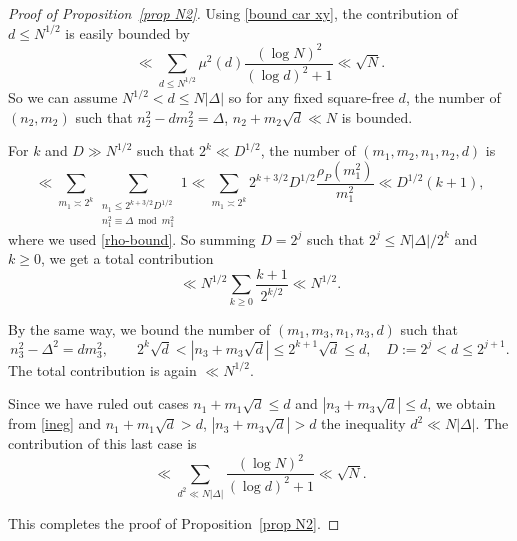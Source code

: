 \documentclass[reqno, 12pt]{amsart}
\theoremstyle{plain}
\theoremstyle{definition}
\theoremstyle{remark}
\renewcommand{\ge}{\geqslant}
\renewcommand{\leq}{\leqslant}
\renewcommand{\geq}{\geqslant}
\begin{document}
\begin{proof}[Proof of Proposition~\ref{prop N2}]
Using \eqref{bound car xy},
the contribution of $d\leq N^{1/2}$ is easily bounded by
$$\ll \sum_{d\leq N^{1/2}}\mu^2(d)\frac{(\log N)^2}{(\log d)^2+1}\ll \sqrt{N}.$$
So we can assume $  N^{1/2}<d\leq N|\Delta| $ so for any fixed square-free $d$, the number of $(n_2,m_2)$ such that $n_2^2-dm_2^2=\Delta$, $n_2 +m_2 \sqrt{d}\ll N$ is bounded.

For $k$ and $D\gg N^{1/2}$ such that $2^k\ll D^{1/2}$, the number of $(m_1,m_2,n_1,n_2,d)$ is 
$$\ll \sum_{m_1\asymp 2^k}\sum_{\substack{n_1\leq 2^{k+3/2}D^{1/2}\\ n_1^2\equiv \Delta\bmod m_1^2}}1
\ll \sum_{m_1\asymp 2^k} 2^{k+3/2}D^{1/2}\frac{\rho_P(m_1^2)}{m_1^2}\ll D^{1/2}(k+1), $$
where we used \eqref{rho-bound}. So summing $D=2^j$ such that $2^j\leq N|\Delta|/2^k $ and $k\geq 0$, we get a total contribution 
$$\ll N^{1/2}\sum_{k\ge 0} \frac{k+1}{2^{k/2}} \ll  N^{1/2}.$$ 

By the same way, we bound the number of $(m_1,m_3,n_1,n_3,d)$ such that 
$$n_3^2-\Delta^2=dm_3^2,\qquad 2^k\sqrt{d}<|n_3+m_3\sqrt{d}|\leq 2^{k+1}\sqrt{d}\leq d,\quad D:=2^j<d\leq 2^{j+1}.$$
The total contribution is again
$ \ll    N^{1/2}.$



Since we have ruled out cases $n_1+m_1\sqrt{d}\leq d$ and $|n_3+m_3\sqrt{d}|\leq d$, we obtain from \eqref{ineg} and $n_1+m_1\sqrt{d}>d$, $|n_3+m_3\sqrt{d}|> d $ the inequality $d^2\ll N|\Delta|.$
The contribution of this last case is 
$$\ll \sum_{d^2\ll N|\Delta|}\frac{(\log N)^2}{(\log d)^2+1}\ll \sqrt{N}.$$


This completes the proof of Proposition~\ref{prop N2}.
 \end{proof}
\end{document}
